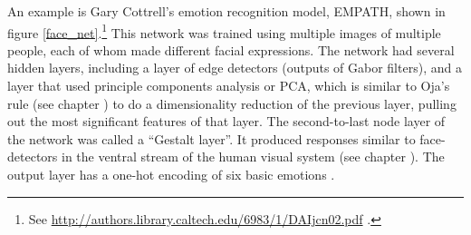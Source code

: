 
An example is Gary Cottrell's  emotion recognition model, EMPATH, shown in figure \ref{face_net}.\footnote{See \url{http://authors.library.caltech.edu/6983/1/DAIjcn02.pdf} \cite{dailey2002empath}.} This network was trained using multiple images of multiple people, each of whom made different facial expressions. The network had several hidden layers, including a layer of edge detectors (outputs of Gabor filters), and a layer that used principle components analysis or PCA, which is similar to Oja's rule (see chapter ) to do a dimensionality reduction of the previous layer, pulling out the most significant features of that layer. The second-to-last node layer of the network was called a ``Gestalt layer''. It produced responses similar to face-detectors in the ventral stream of the human visual system  (see chapter ). The output layer has a one-hot encoding of six basic emotions \cite{dailey2002empath}. 

